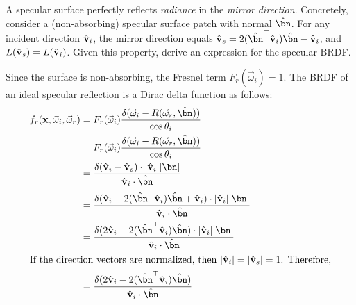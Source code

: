 \begin{problem}
\begin{enumroman}
    \newpage
    \item A specular surface perfectly reflects \emph{radiance} in the
      \emph{mirror direction}. Concretely, consider a (non-absorbing)
      specular surface patch with normal $\hat{\bn}$.
      For any incident direction $\hat{\mathbf{v}}_i$, the mirror direction
      equals $\hat{\bv}_s = 2(\hat{\bn}^\top \hat{\bv}_i)\hat{\bn} - \hat{\bv}_i$,
      and $L(\hat{\mathbf{v}}_s) = L(\hat{\mathbf{v}}_i)$.
      Given this property, derive an expression for the specular BRDF.
      \begin{answer}
        Since the surface is non-absorbing, the Fresnel term
        \( F_r(\vec{\omega}_i) = 1. \)
        The BRDF of an ideal specular reflection is a Dirac delta function as follows:
        \begin{align*}
          f_r(\bx, \vec{\omega}_i, \vec{\omega}_r) &= F_r(\vec{\omega}_i)
            \frac{\delta(\vec{\omega}_i - R(\vec{\omega}_r, \hat{\bn}))}{\cos \theta_i} \\
          &= F_r(\vec{\omega}_i) \frac{\delta(\vec{\omega}_i - R(\vec{\omega}_r,
            \hat{\bn}))}{\cos \theta_i} \\
          &= \frac{\delta(\hat{\bv}_i - \hat{\bv}_s)\cdot{\abs{\hat{\bv}_i}\abs{\bn}}}{\hat{\bv}_i \cdot \hat{\bn}} \\
          &= \frac{\delta(\hat{\bv}_i - 2(\hat{\bn}^\top \hat{\bv}_i)\hat{\bn}
            + \hat{\bv}_i) \cdot{\abs{\hat{\bv}_i}\abs{\bn}}}{\hat{\bv}_i \cdot \hat{\bn}} \\
          &= \frac{\delta(2\hat{\bv}_i - 2(\hat{\bn}^\top \hat{\bv}_i)\hat{\bn})
            \cdot{\abs{\hat{\bv}_i}\abs{\bn}}}
              {\hat{\bv}_i \cdot \hat{\bn}} \\
          \intertext{If the direction vectors are normalized, then
            $\abs{\hat{\bv}_i} = \abs{\hat{\bv}_s} = 1$. Therefore,}
          &= \frac{\delta(2\hat{\bv}_i - 2(\hat{\bn}^\top \hat{\bv}_i)\hat{\bn})}
              {\hat{\bv}_i \cdot \hat{\bn}} \\
        \end{align*}
      \end{answer}
  \end{enumroman}
\end{problem}
